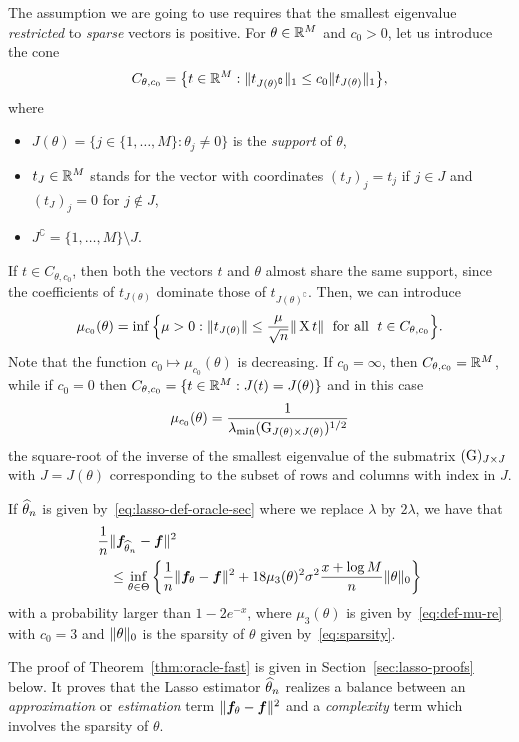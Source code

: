 The assumption we are going to use requires that the smallest eigenvalue \emph{restricted} to \emph{sparse} vectors is positive.
For $\theta \in \mathbb R^M$ and $c_0 > 0$, let us introduce the cone
\begin{equation}
	\label{eq:def-cone-C}
	C_{\theta, c_0} = \big\{ t \in \mathbb R^M : \| t_{J(\theta)^\complement} \|_1 
	\leq c_0 \| t_{J(\theta)} \|_1 \big\},
\end{equation}
where
\begin{itemize}
	\item $J(\theta) = \{ j \in \{1, \ldots, M\} : \theta_j \neq 0 \}$ is the 
	\emph{support} of $\theta$,
	\item $t_J \in \mathbb R^M$ stands for the vector with coordinates $(t_J)_j = t_j$ if $j \in J$ and $(t_J)_j = 0$ for $j \notin J$,
	\item $J^\complement = \{ 1, \ldots, M \} \setminus J$.
\end{itemize}
If $t \in C_{\theta, c_0}$, then both the vectors $t$ and $\theta$ almost share the same support, since the coefficients of $t_{J(\theta)}$ dominate those of $t_{J(\theta)^\complement}$.
Then, we can introduce 
\begin{equation}
	\label{eq:def-mu-re}
	\mu_{c_0}(\theta) = \inf \Big\{ \mu > 0 : 
	\| t_{J(\theta)} \| \leq \frac{\mu}{\sqrt n} \| \operatorname{{\boldsymbol X}} t \| 
	\; \text{ for all } \; t \in C_{\theta, c_0} \Big\}.
\end{equation}
Note that the function $c_0 \mapsto \mu_{c_0}(\theta)$ is decreasing.
If $c_0 = \infty$, then $C_{\theta, c_0} = \mathbb R^M$, while if $c_0 = 0$ then
$C_{\theta, c_0} = \{ t \in \mathbb R^M : J(t) = J(\theta) \}$ and in this case
\begin{equation*}
	\mu_{c_0}(\theta) 
	= \frac{1}{\lambda_{\min}(\operatorname{{\boldsymbol G}}_{J(\theta) \times J(\theta)})^{1/2}}
\end{equation*}
the square-root of the inverse of the smallest eigenvalue of the submatrix $(\operatorname{{\boldsymbol G}})_{J \times J}$ with $J = J(\theta)$ corresponding to the subset of rows and columns with index in $J$.
\begin{theorem}
	\label{thm:oracle-fast}
	If $\widehat \theta_n$ is given by~\eqref{eq:lasso-def-oracle-sec} where we replace $\lambda$ by $2 \lambda$, we have that
	\begin{align*}
		\frac 1n &\| {\boldsymbol f}_{\widehat \theta_n} - {\boldsymbol f} \|^2 \\
		&\leq \inf_{\theta \in \Theta} 
		\bigg\{ \frac 1n  \| {\boldsymbol f}_{\theta} - {\boldsymbol f} \|^2  + 18 \mu_3(\theta)^2 \sigma^2 \frac{x + \log M}{n} \| \theta \|_0 \bigg\}
	\end{align*}
	with a probability larger than $1 - 2 e^{-x}$, where $\mu_3(\theta)$ is given by~\eqref{eq:def-mu-re} with $c_0 = 3$ and $\| \theta \|_0$ is the sparsity of $\theta$ given by~\eqref{eq:sparsity}.
\end{theorem}
The proof of Theorem~\ref{thm:oracle-fast} is given in Section~\ref{sec:lasso-proofs} below.
It proves that the Lasso estimator $\widehat \theta_n$ realizes a balance between an \emph{approximation} or \emph{estimation} term $\| {\boldsymbol f}_{\theta} - {\boldsymbol f} \|^2$ and a \emph{complexity} term which involves  the sparsity of $\theta$.


